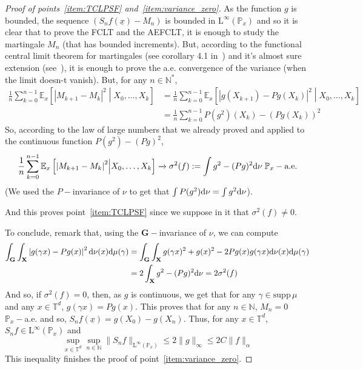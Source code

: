 \documentclass[11pt]{amsart}
\theoremstyle{definition}
\theoremstyle{remark}
\numberwithin{equation}{section}
\begin{document}
\begin{proof}[Proof of points~\ref{item:TCLPSF}  and~\ref{item:variance_zero}]
As the function $g$ is bounded, the sequence $(S_nf(\underline{x}) - M_n)$ is bounded in $\mathrm{L}^\infty({\mathbb P}_x)$ and so it is clear that to prove the FCLT and the AEFCLT, it is enough to study the martingale $M_n$ (that has bounded increments). But, according to the functional central limit theorem for martingales (see corollary 4.1 in~\cite{HH80}) and it's almost sure extension (see~\cite{Cha96}), it is enough to prove the a.e. convergence of the variance (when the limit doesn-t vanish). But, for any $n\in {\mathbb N}^\ast$,
\begin{align*}
\frac 1 n \sum_{k=0}^{n-1} {\mathbb E}_x\left[\left| M_{k+1} - M_k\right|^2 \middle|X_0, \dots ,X_k \right] &= \frac 1 n \sum_{k=0}^{n-1} {\mathbb E}_x\left[\left| g(X_{k+1}) - Pg(X_k)\right|^2 \middle|X_0, \dots ,X_k \right] \\& = \frac 1 n \sum_{k=0}^{n-1} P(g^2)(X_k) - (Pg(X_k))^2 
\end{align*}
So, according to the law of large numbers that we already proved and applied to the continuous function $P(g^2) - (Pg)^2$,
\[
\frac 1 n \sum_{k=0}^{n-1} {\mathbb E}_x\left[\left| M_{k+1} - M_k\right|^2 \middle|X_0, \dots ,X_k \right]  \xrightarrow \,\sigma^2(f):=\int g^2 - (Pg)^2 {{\rm d}}\nu \;{\mathbb P}_x-\text{a.e.} 
\]
(We used the $P-$invariance of $\nu$ to get that $\int P(g^2) {{\rm d}}\nu = \int g^2 {{\rm d}}\nu$).

And this proves point~\ref{item:TCLPSF} since we suppose in it that $\sigma^2(f) \not=0$.

\medskip
To conclude, remark that, using the ${\mathbf G}-$invariance of $\nu$, we can compute
\begin{align*}
\int_{\mathbf G}\int_{\mathbf X}  \left| g(\gamma x) - P g(x)\right|^2{{\rm d}}\nu(x)  {{\rm d}}\mu(\gamma) &=  \int_{\mathbf G}  \int_{\mathbf X} g(\gamma x)^2 + g(x)^2 -2Pg(x) g(\gamma x) {{\rm d}}\nu(x) {{\rm d}}\mu(\gamma) \\
&= 2 \int_{\mathbf X} g^2 - (Pg)^2 {{\rm d}}\nu = 2\sigma^2(f)
\end{align*}
And so, if $\sigma^2(f) = 0$, then, as $g$ is continuous, we get that for any $\gamma \in {\mathrm{supp}\,} \mu$ and any $x\in {\mathbb T}^d$, $g(\gamma x) = Pg(x)$. This proves that for any $n\in {\mathbb N}$, $M_n=0$ ${\mathbb P}_x-$a.e. and so, $S_n f(\underline{x}) = g(X_0) - g(X_n)$.
Thus, for any $x\in {\mathbb T}^d$, $S_nf \in \mathrm{L}^{\infty}({\mathbb P}_x)$ and
\[
\sup_{x\in {\mathbb T}^d} \sup_{n\in {\mathbb N}} \|S_nf\|_{\mathrm{L}^\infty({\mathbb P}_x)} \leqslant 2 \|g\|_\infty \leqslant 2C \|f\|_\alpha
\]
This inequality finishes the proof of point~\ref{item:variance_zero}.
\end{proof}
\end{document}
